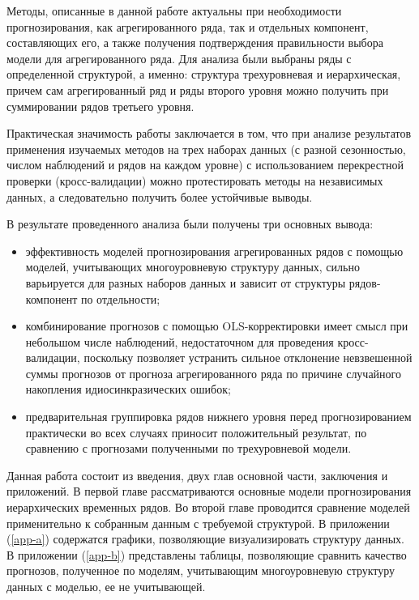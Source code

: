 \documentclass[12pt,a4paper, oneside]{extreport}
\begin{document}
Методы, описанные в данной работе актуальны при необходимости прогнозирования, как агрегированного ряда, так и отдельных компонент, составляющих его, а также получения подтверждения правильности выбора модели для агрегированного ряда.
Для анализа были выбраны ряды с определенной структурой, а именно: 
структура трехуровневая и иерархическая, причем сам агрегированный ряд и ряды второго уровня можно получить при суммировании рядов третьего уровня. 



Практическая значимость работы заключается в том, что при анализе результатов применения изучаемых методов на трех наборах данных (с разной сезонностью, числом наблюдений и рядов на каждом уровне)   с использованием перекрестной проверки (кросс-валидации) можно протестировать методы на независимых данных, а следовательно получить более устойчивые  выводы. 



В результате проведенного анализа были получены три основных вывода: 

\begin{itemize}
	\item эффективность  моделей прогнозирования  агрегированных рядов с помощью моделей, учитывающих многоуровневую структуру данных,  сильно варьируется для разных наборов данных и зависит от структуры рядов-компонент   по отдельности;
\item комбинирование прогнозов с помощью OLS-корректировки  имеет смысл при небольшом числе наблюдений, недостаточном для проведения кросс-валидации, поскольку позволяет устранить сильное отклонение невзвешенной суммы прогнозов от прогноза агрегированного ряда по причине случайного накопления идиосинкразических ошибок;
\item     предварительная группировка рядов нижнего уровня перед прогнозированием практически во всех случаях приносит положительный результат, по сравнению с прогнозами полученными по трехуровневой модели. 
\end{itemize}



Данная работа состоит из введения, двух глав основной части, заключения и приложений. В первой главе рассматриваются основные модели прогнозирования иерархических временных рядов.  Во второй главе проводится  сравнение моделей применительно к собранным данным с требуемой структурой. 
В приложении (\ref{app-a}) содержатся графики, позволяющие визуализировать структуру данных. В приложении (\ref{app-b}) представлены таблицы, позволяющие сравнить качество прогнозов, полученное по  моделям, учитывающим многоуровневую  структуру данных с моделью, ее не учитывающей. 
\end{document}
